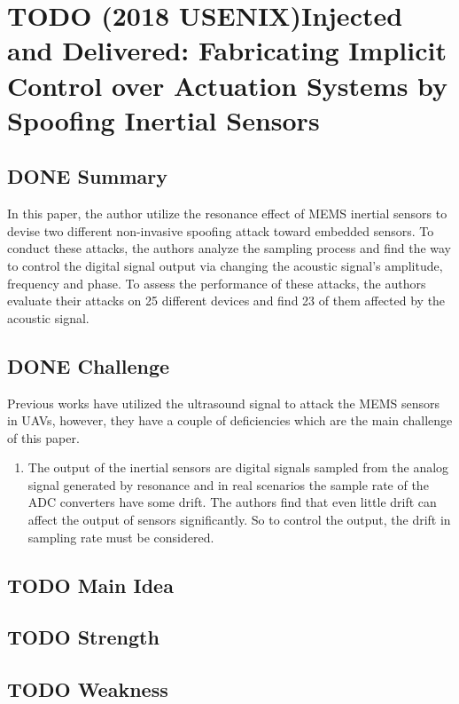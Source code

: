 \documentclass[11pt]{article}
\author{lijin}
\date{\today}
\title{}
\begin{document}
\tableofcontents

\section{{\bfseries\sffamily TODO} (2018 USENIX)Injected and Delivered: Fabricating Implicit Control over Actuation Systems by Spoofing Inertial Sensors}
\label{sec:org150decb}
\subsection{{\bfseries\sffamily DONE} Summary}
\label{sec:orgf0aed94}
In this paper, the author utilize the resonance effect of MEMS inertial sensors to devise two different non-invasive spoofing attack toward embedded sensors. To conduct these attacks, the authors analyze the sampling process and find the way to control the digital signal output via changing the acoustic signal's amplitude, frequency and phase. To assess the performance of these attacks, the authors evaluate their attacks on 25 different devices and find 23 of them affected by the acoustic signal.
\subsection{{\bfseries\sffamily DONE} Challenge}
\label{sec:org2663060}
Previous works have utilized the ultrasound signal to attack the MEMS sensors in UAVs, however, they have a couple of deficiencies which are the main challenge of this paper.
\begin{enumerate}
\item The output of the inertial sensors are digital signals sampled from the analog signal generated by resonance and in real scenarios the sample rate of the ADC converters have some drift. The authors find that even little drift can affect the output of sensors significantly. So to control the output, the drift in sampling rate must be considered.
\end{enumerate}
\subsection{{\bfseries\sffamily TODO} Main Idea}
\label{sec:orga71b3d9}

\subsection{{\bfseries\sffamily TODO} Strength}
\label{sec:org85cc33e}
\subsection{{\bfseries\sffamily TODO} Weakness}
\label{sec:orgb35a96c}
\end{document}
